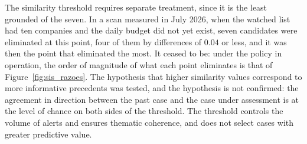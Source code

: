 The similarity threshold requires separate treatment, since it is the least grounded of the seven.
In a scan measured in July 2026, when the watched list had ten companies and the daily budget did
not yet exist, seven candidates were eliminated at this point, four of them by differences of
$0.04$ or less, and it was then the point that eliminated the most. It ceased to be: under the
policy in operation, the order of magnitude of what each point eliminates is that of
Figure~\ref{fig:sis_razoes}. The hypothesis that higher similarity values correspond to more
informative precedents was tested, and the hypothesis is not confirmed: the agreement in direction
between the past case and the case under assessment is at the level of chance on both sides of the
threshold. The threshold controls the volume of alerts and ensures thematic coherence, and does not
select cases with greater predictive value.

